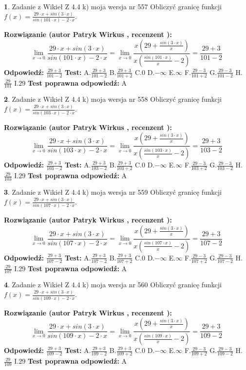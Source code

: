 \documentclass[12pt, a4paper]{article}
\theoremstyle{definition} %
\newtheorem{zad}{}
\newcommand{\zadStart}[1]{\begin{zad}#1\newline}
\newcommand{\zadStop}{\end{zad}}
\newcommand{\rozwStart}[2]{\noindent \textbf{Rozwiązanie (autor #1 , recenzent #2): }\newline}
\newcommand{\rozwStop}{\newline}
\newcommand{\odpStart}{\noindent \textbf{Odpowiedź:}\newline}
\newcommand{\odpStop}{\newline}
\newcommand{\testStart}{\noindent \textbf{Test:}\newline}
\newcommand{\testStop}{\newline}
\newcommand{\kluczStart}{\noindent \textbf{Test poprawna odpowiedź:}\newline}
\newcommand{\kluczStop}{\newline}
\begin{document}
\zadStart{Zadanie z Wikieł Z 4.4 k) moja wersja nr 557}
Obliczyć granicę funkcji $f(x)=\frac{29\cdot x +sin(3\cdot x)}{sin(101\cdot x) -2\cdot x}$.
\zadStop
\rozwStart{Patryk Wirkus}{}
$$\lim\limits_{x\to 0}\frac{29\cdot x +sin(3\cdot x)}{sin(101\cdot x) -2\cdot x}
=\lim\limits_{x\to 0}\frac{x(29+\frac{sin(3\cdot x)}{x})}{x(\frac{sin(101\cdot x)}{x}-2)}
=\frac{29+3}{101-2}$$
\rozwStop
\odpStart
$\frac{29+3}{101-2}$
\odpStop
\testStart
A.$\frac{29+3}{101-2}$
B.$\frac{29+3}{101+2}$
C.$0$
D.$-\infty$
E.$\infty$
F.$\frac{29-3}{101+2}$
G.$\frac{29-3}{101-2}$
H.$\frac{29}{101}$
I.$29$
\testStop
\kluczStart
A
\kluczStop



\zadStart{Zadanie z Wikieł Z 4.4 k) moja wersja nr 558}
Obliczyć granicę funkcji $f(x)=\frac{29\cdot x +sin(3\cdot x)}{sin(103\cdot x) -2\cdot x}$.
\zadStop
\rozwStart{Patryk Wirkus}{}
$$\lim\limits_{x\to 0}\frac{29\cdot x +sin(3\cdot x)}{sin(103\cdot x) -2\cdot x}
=\lim\limits_{x\to 0}\frac{x(29+\frac{sin(3\cdot x)}{x})}{x(\frac{sin(103\cdot x)}{x}-2)}
=\frac{29+3}{103-2}$$
\rozwStop
\odpStart
$\frac{29+3}{103-2}$
\odpStop
\testStart
A.$\frac{29+3}{103-2}$
B.$\frac{29+3}{103+2}$
C.$0$
D.$-\infty$
E.$\infty$
F.$\frac{29-3}{103+2}$
G.$\frac{29-3}{103-2}$
H.$\frac{29}{103}$
I.$29$
\testStop
\kluczStart
A
\kluczStop



\zadStart{Zadanie z Wikieł Z 4.4 k) moja wersja nr 559}
Obliczyć granicę funkcji $f(x)=\frac{29\cdot x +sin(3\cdot x)}{sin(107\cdot x) -2\cdot x}$.
\zadStop
\rozwStart{Patryk Wirkus}{}
$$\lim\limits_{x\to 0}\frac{29\cdot x +sin(3\cdot x)}{sin(107\cdot x) -2\cdot x}
=\lim\limits_{x\to 0}\frac{x(29+\frac{sin(3\cdot x)}{x})}{x(\frac{sin(107\cdot x)}{x}-2)}
=\frac{29+3}{107-2}$$
\rozwStop
\odpStart
$\frac{29+3}{107-2}$
\odpStop
\testStart
A.$\frac{29+3}{107-2}$
B.$\frac{29+3}{107+2}$
C.$0$
D.$-\infty$
E.$\infty$
F.$\frac{29-3}{107+2}$
G.$\frac{29-3}{107-2}$
H.$\frac{29}{107}$
I.$29$
\testStop
\kluczStart
A
\kluczStop



\zadStart{Zadanie z Wikieł Z 4.4 k) moja wersja nr 560}
Obliczyć granicę funkcji $f(x)=\frac{29\cdot x +sin(3\cdot x)}{sin(109\cdot x) -2\cdot x}$.
\zadStop
\rozwStart{Patryk Wirkus}{}
$$\lim\limits_{x\to 0}\frac{29\cdot x +sin(3\cdot x)}{sin(109\cdot x) -2\cdot x}
=\lim\limits_{x\to 0}\frac{x(29+\frac{sin(3\cdot x)}{x})}{x(\frac{sin(109\cdot x)}{x}-2)}
=\frac{29+3}{109-2}$$
\rozwStop
\odpStart
$\frac{29+3}{109-2}$
\odpStop
\testStart
A.$\frac{29+3}{109-2}$
B.$\frac{29+3}{109+2}$
C.$0$
D.$-\infty$
E.$\infty$
F.$\frac{29-3}{109+2}$
G.$\frac{29-3}{109-2}$
H.$\frac{29}{109}$
I.$29$
\testStop
\kluczStart
A
\kluczStop
\end{document}
